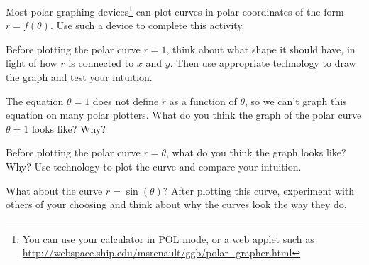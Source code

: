 \begin{activity} \label{A:11.5.2} Most polar graphing devices\footnote{You can use your calculator in POL mode, or a web applet such as \url{http://webspace.ship.edu/msrenault/ggb/polar_grapher.html}} can plot curves in polar coordinates of the form $r = f(\theta)$. Use such a device to complete this activity.
	\ba
	\item Before plotting the polar curve $r=1$, think about what shape it should have, in light of how $r$ is connected to $x$ and $y$. Then use appropriate technology to draw the graph and test your intuition.

	\item The equation $\theta = 1$ does not define $r$ as a function of $\theta$, so we can't graph this equation on many polar plotters. What do you think the graph of the polar curve $\theta = 1$ looks like? Why?
	
	\item Before plotting the polar curve $r = \theta$, what do you think the graph looks like? Why? Use technology to plot the curve and compare your intuition.

         \item What about the curve $r = \sin(\theta)$?  After plotting this curve, experiment with others of your choosing and think about why the curves look the way they do.	
    	
	\ea

\end{activity}
\begin{smallhint}

\end{smallhint}
\begin{bighint}

\end{bighint}
